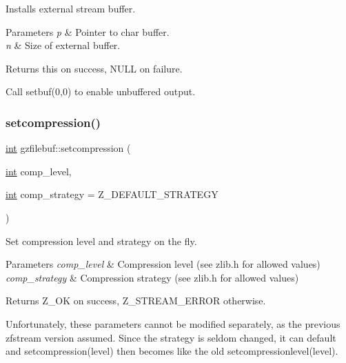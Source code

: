 Installs external stream buffer. 


\begin{DoxyParams}{Parameters}
{\em p} & Pointer to char buffer. \\
\hline
{\em n} & Size of external buffer. \\
\hline
\end{DoxyParams}
\begin{DoxyReturn}{Returns}
{\ttfamily this} on success, N\+U\+LL on failure.
\end{DoxyReturn}
Call setbuf(0,0) to enable unbuffered output. \mbox{\label{classgzfilebuf_ad109ea4fc4ca7cc19d8014b53375255d}} 
\subsubsection{\texorpdfstring{setcompression()}{setcompression()}}
{\footnotesize\ttfamily \hyperlink{lp__lib_8h_adeb9ec6400320e4923ac9d836d509ddb}{int} gzfilebuf\+::setcompression (\begin{DoxyParamCaption}\item[{\hyperlink{lp__lib_8h_adeb9ec6400320e4923ac9d836d509ddb}{int}}]{comp\+\_\+level,  }\item[{\hyperlink{lp__lib_8h_adeb9ec6400320e4923ac9d836d509ddb}{int}}]{comp\+\_\+strategy = {\ttfamily Z\+\_\+DEFAULT\+\_\+STRATEGY} }\end{DoxyParamCaption})}



Set compression level and strategy on the fly. 


\begin{DoxyParams}{Parameters}
{\em comp\+\_\+level} & Compression level (see zlib.\+h for allowed values) \\
\hline
{\em comp\+\_\+strategy} & Compression strategy (see zlib.\+h for allowed values) \\
\hline
\end{DoxyParams}
\begin{DoxyReturn}{Returns}
Z\+\_\+\+OK on success, Z\+\_\+\+S\+T\+R\+E\+A\+M\+\_\+\+E\+R\+R\+OR otherwise.
\end{DoxyReturn}
Unfortunately, these parameters cannot be modified separately, as the previous zfstream version assumed. Since the strategy is seldom changed, it can default and setcompression(level) then becomes like the old setcompressionlevel(level). \mbox{\label{classgzfilebuf_aa6c80a4f96fdc5e4a991113699428164}} 
